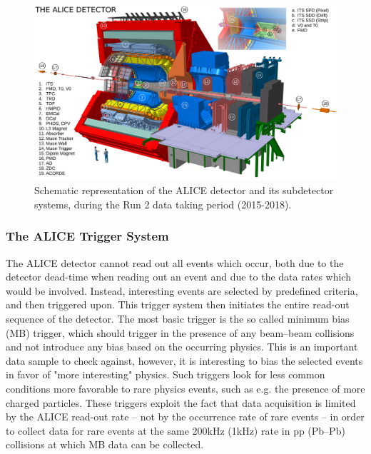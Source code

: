 \begin{figure}
    \centering
    \includegraphics[width=\textwidth]{figures/2017-May-11-ALICE_RUN2_labels_HD.png}
    \caption{Schematic representation of the ALICE detector and its subdetector systems, during the Run 2 data taking period (2015-2018).}
    \label{fig:ALICE}
\end{figure}

\subsubsection{The ALICE Trigger System}
The ALICE detector cannot read out all events which occur, both due to the detector dead-time when reading out an event and due to the data rates which would be involved. Instead, interesting events are selected by predefined criteria, and then triggered upon. This trigger system then initiates the entire read-out sequence of the detector. The most basic trigger is the so called minimum bias (MB) trigger, which should trigger in the presence of any beam--beam collisions and not introduce any bias based on the occurring physics. This is an important data sample to check against, however, it is interesting to bias the selected events in favor of "more interesting" physics. Such triggers look for less common conditions more favorable to rare physics events, such as e.g. the presence of more charged particles. These triggers exploit the fact that data acquisition is limited by the ALICE read-out rate -- not by the occurrence rate of rare events -- in order to collect data for rare events at the same 200kHz (1kHz) rate  in pp (Pb--Pb) collisions at which MB data can be collected. \\

